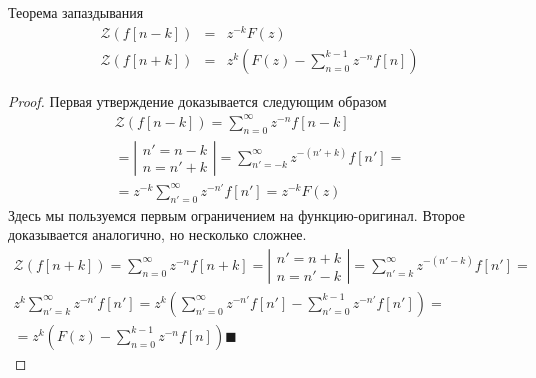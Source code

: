 \documentclass[12pt,twoside]{report}
\theoremstyle{MyNonumberplain}
\begin{document}
        \begin{theorem}{Теорема запаздывания}
                \begin{eqnarray*}
                    \mathcal{Z}(f[n-k])&=&z^{-k}F(z)\\
                    \mathcal{Z}(f[n+k])&=&z^{k}\left(F(z)- \sum_{n=0}^{k-1} z^{-n}f[n]\right)
                \end{eqnarray*}
        \end{theorem}
        \begin{proof}
            Первая утверждение доказывается следующим образом
            \[
                \begin{aligned}
                    \mathcal{Z}(f[n-k])=\sum_{n=0}^\infty z^{-n}f[n-k] \\ 
                    =\left|\begin{split}n'=n-k\\n=n'+k\end{split}\right|= 
                    \sum_{n'=-k}^\infty z^{-(n'+k)}f[n']= \\ 
                    =z^{-k}\sum_{n'=0}^\infty z^{-n'}f[n']=z^{-k}F(z)
                \end{aligned}
            \]
            Здесь мы пользуемся первым ограничением на функцию-оригинал.
            Второе доказывается аналогично, но несколько сложнее.
            \[
            \begin{aligned}
                \mathcal{Z}(f[n+k])=\sum_{n=0}^\infty z^{-n}f[n+k]= 
                \left|\begin{split}n'=n+k\\n=n'-k\end{split}\right|=
                \sum_{n'=k}^\infty z^{-(n'-k)}f[n']=\\ 
                z^{k}\sum_{n'=k}^\infty z^{-n'}f[n']=
                z^{k}\left(\sum_{n'=0}^\infty z^{-n'}f[n']- \sum_{n'=0}^{k-1} z^{-n'}f[n']\right)= \\
                =z^{k}\left(F(z)- \sum_{n=0}^{k-1} z^{-n}f[n]\right)\blacksquare
            \end{aligned}
            \]
        \end{proof}
\end{document}
